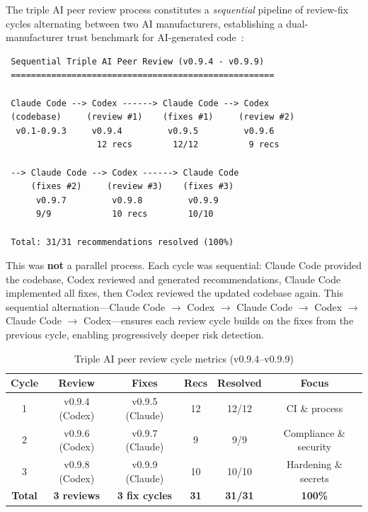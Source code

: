 \documentclass[10pt]{article}
\begin{document}
The triple AI peer review process constitutes a \emph{sequential} pipeline of review-fix cycles alternating between two AI manufacturers, establishing a dual-manufacturer trust benchmark for AI-generated code~\cite{kawchak2026peerreview}:

\begin{verbatim}
 Sequential Triple AI Peer Review (v0.9.4 - v0.9.9)
 ====================================================

 Claude Code --> Codex ------> Claude Code --> Codex
 (codebase)     (review #1)    (fixes #1)     (review #2)
  v0.1-0.9.3     v0.9.4         v0.9.5         v0.9.6
                  12 recs        12/12          9 recs

 --> Claude Code --> Codex ------> Claude Code
     (fixes #2)     (review #3)    (fixes #3)
      v0.9.7         v0.9.8         v0.9.9
      9/9            10 recs        10/10

 Total: 31/31 recommendations resolved (100%)
\end{verbatim}

This was \textbf{not} a parallel process. Each cycle was sequential: Claude Code provided the codebase, Codex reviewed and generated recommendations, Claude Code implemented all fixes, then Codex reviewed the updated codebase again. This sequential alternation---Claude Code $\to$ Codex $\to$ Claude Code $\to$ Codex $\to$ Claude Code $\to$ Codex---ensures each review cycle builds on the fixes from the previous cycle, enabling progressively deeper risk detection.

\begin{table}[H]
\centering
\caption{Triple AI peer review cycle metrics (v0.9.4--v0.9.9)}
\label{tab:peerreview}
\small
\begin{tabular}{@{}cccccc@{}}
\toprule
\textbf{Cycle} & \textbf{Review} & \textbf{Fixes} & \textbf{Recs} & \textbf{Resolved} & \textbf{Focus} \\
\midrule
1 & v0.9.4 (Codex) & v0.9.5 (Claude) & 12 & 12/12 & CI \& process \\
2 & v0.9.6 (Codex) & v0.9.7 (Claude) & 9 & 9/9 & Compliance \& security \\
3 & v0.9.8 (Codex) & v0.9.9 (Claude) & 10 & 10/10 & Hardening \& secrets \\
\midrule
\textbf{Total} & \textbf{3 reviews} & \textbf{3 fix cycles} & \textbf{31} & \textbf{31/31} & \textbf{100\%} \\
\bottomrule
\end{tabular}
\end{table}
\end{document}
